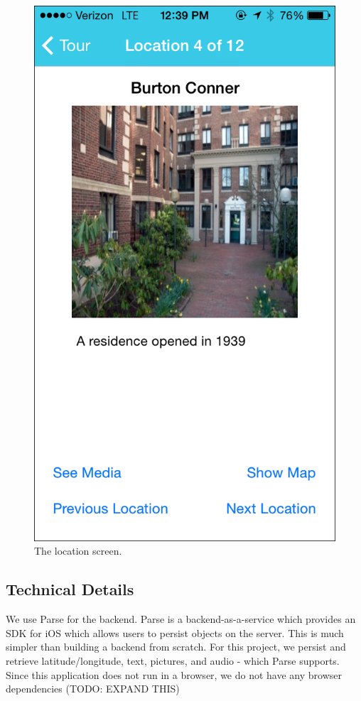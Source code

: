 \documentclass{sigchi}
\begin{document}
\begin{figure}
\centering
\includegraphics[width=1.0\linewidth]{./LocationScreen}
\caption{The location screen.}
\label{fig:LocationScreen}
\end{figure}

\subsection{Technical Details}
We use Parse for the backend. Parse is a backend-as-a-service which provides an SDK for iOS which allows users to persist objects on the server. This is much simpler than building a backend from scratch. For this project, we persist and retrieve latitude/longitude, text, pictures, and audio - which Parse supports. Since this application does not run in a browser, we do not have any browser dependencies (TODO: EXPAND THIS)
    
\end{document}
